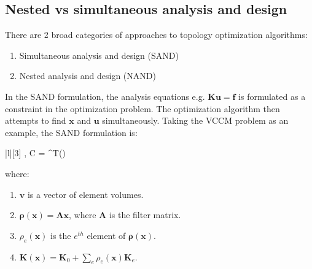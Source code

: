 \subsection{Nested vs simultaneous analysis and design}

There are 2 broad categories of approaches to topology optimization algorithms:
\begin{enumerate}
    \item Simultaneous analysis and design (SAND)
    \item Nested analysis and design (NAND)
\end{enumerate}

In the SAND formulation, the analysis equations e.g. $\bm{K} \bm{u} = \bm{f}$ is formulated as a constraint in the optimization problem. The optimization algorithm then attempts to find $\bm{x}$ and $\bm{u}$ simultaneously. Taking the VCCM problem as an example, the SAND formulation is:
\begin{mini!}|l|[3]
    {, }{C = ^T()}{}{}
\end{mini!}
where:
\begin{enumerate}
    \item $\bm{v}$ is a vector of element volumes.
    \item $\bm{\rho}(\bm{x}) = \bm{A} \bm{x}$, where $\bm{A}$ is the filter matrix.
    \item $\rho_e(\bm{x})$ is the $e^{th}$ element of $\bm{\rho}(\bm{x})$.
    \item $\bm{K}(\bm{x}) = \bm{K}_0 + \sum_e \rho_e(\bm{x}) \bm{K}_e$.
\end{enumerate}

